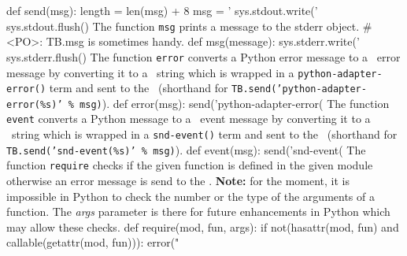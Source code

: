 def send(msg):
        length = len(msg) + 8
        msg = '%
        sys.stdout.write('%
        sys.stdout.flush()
\nwendcode{}\nwdocspar
The function \texttt{msg} prints a message to the stderr object.
\nwenddocs{}\plusendmoddef\let\nwnotused=\nwoutput{}\nwstartdeflinemarkup{}\nwenddeflinemarkup
# <PO>: TB.msg is sometimes handy.
def msg(message):
        sys.stderr.write('%
        sys.stderr.flush()
\nwendcode{}\nwdocspar
The function \texttt{error} converts a Python error message to a \TB\
error message by converting it to a \TB\ string which is wrapped in a
\texttt{python-adapter-error()} term and sent to the \TB\ (shorthand for
  \texttt{TB.send('python-adapter-error(\%s)' \% msg)}).
\nwenddocs{}\plusendmoddef\let\nwnotused=\nwoutput{}\nwstartdeflinemarkup{}\nwenddeflinemarkup
def error(msg):
        send('python-adapter-error(%
\nwendcode{}\nwdocspar
The function \texttt{event} converts a Python message to a \TB\
event message by converting it to a \TB\ string which is wrapped in a
\texttt{snd-event()} term and sent to the \TB\ (shorthand for
  \texttt{TB.send('snd-event(\%s)' \% msg)}).
\nwenddocs{}\nwbegincode{13}\sublabel{NWTB.8-TB.5-7}\plusendmoddef\let\nwnotused=\nwoutput{}\nwstartdeflinemarkup{}\nwenddeflinemarkup
def event(msg):
        send('snd-event(%
\nwendcode{}\nwdocspar
The function \texttt{require} checks if the given function is defined
in the given module otherwise an error message is send to the
\TB. {\bf Note:} for the moment, it is impossible in Python to check
the number or the type of the arguments of a function. The \emph{args}
parameter is there for future enhancements in Python which may allow
these checks. 
\nwenddocs{}\nwbegincode{15}\sublabel{NWTB.8-TB.5-8}\plusendmoddef\let\nwnotused=\nwoutput{}\nwstartdeflinemarkup{}\nwenddeflinemarkup
def require(mod, fun, args):
        if not(hasattr(mod, fun) and callable(getattr(mod, fun))):
                error("%
\nwendcode{}

%
\nwdocspar

\nwenddocs{}

